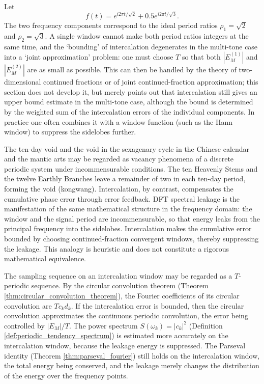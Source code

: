 \begin{example}\label{ex:multi_tone_intercalation}
Let
\[
f(t)=e^{i2\pi t/\sqrt{2}}+0.5e^{i2\pi t/\sqrt{3}}.
\]
The two frequency components correspond to the ideal period ratios $\rho_1=\sqrt{2}$ and $\rho_2=\sqrt{3}$. A single window cannot make both period ratios integers at the same time, and the `bounding' of intercalation degenerates in the multi-tone case into a `joint approximation' problem: one must choose $T$ so that both $|E_M^{(1)}|$ and $|E_M^{(2)}|$ are as small as possible. This can then be handled by the theory of two-dimensional continued fractions or of joint continued-fraction approximation; this section does not develop it, but merely points out that intercalation still gives an upper bound estimate in the multi-tone case, although the bound is determined by the weighted sum of the intercalation errors of the individual components. In practice one often combines it with a window function (such as the Hann window) to suppress the sidelobes further.
\end{example}

\begin{remark}\label{rem:xunkong_leakage_analogy}
The ten-day void and the void in the sexagenary cycle in the Chinese calendar and the mantic arts may be regarded as vacancy phenomena of a discrete periodic system under incommensurable conditions. The ten Heavenly Stems and the twelve Earthly Branches leave a remainder of two in each ten-day period, forming the void (kongwang). Intercalation, by contrast, compensates the cumulative phase error through error feedback. DFT spectral leakage is the manifestation of the same mathematical structure in the frequency domain: the window and the signal period are incommensurable, so that energy leaks from the principal frequency into the sidelobes. Intercalation makes the cumulative error bounded by choosing continued-fraction convergent windows, thereby suppressing the leakage. This analogy is heuristic and does not constitute a rigorous mathematical equivalence.
\end{remark}

\begin{remark}\label{rem:intercalation_convolution_spectrum}
The sampling sequence on an intercalation window may be regarded as a \(T\)-periodic sequence. By the circular convolution theorem (Theorem \ref{thm:circular_convolution_theorem}), the Fourier coefficients of its circular convolution are \(Tc_kd_k\). If the intercalation error is bounded, then the circular convolution approximates the continuous periodic convolution, the error being controlled by \(|E_M|/T\). The power spectrum \(S(\omega_k)=|c_k|^2\) (Definition \ref{def:periodic_tendency_spectrum}) is estimated more accurately on the intercalation window, because the leakage energy is suppressed. The Parseval identity (Theorem \ref{thm:parseval_fourier}) still holds on the intercalation window, the total energy being conserved, and the leakage merely changes the distribution of the energy over the frequency points.
\end{remark}

